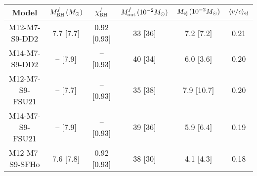 \begin{tabular}{c cc ccc}
	\toprule \toprule
	Model & $M_{\rm BH}^f\,(M_\odot)$ & $\chi_{\rm BH}^f$ & $M_{\rm out}^f\,(10^{-2} M_\odot)$ & $M_{\rm ej}\,(10^{-2} M_\odot)$ & $\langle v/c \rangle_{\rm ej}$\\
	\midrule
	M12-M7-S9-DD2 & 7.7 [7.7] & 0.92 [0.93] & 33 [36] & 7.2 [7.2] & 0.21\\
	M14-M7-S9-DD2 & -- [7.9] & -- [0.93] & 40 [34] & 6.0 [3.6] & 0.20\\
	M12-M7-S9-FSU21 & -- [7.7] & -- [0.93] & 35 [38] & 7.9 [10.7] & 0.20\\
	M14-M7-S9-FSU21 & -- [7.9] & -- [0.93] & 39 [36] & 5.9 [6.4] & 0.19\\
	M12-M7-S9-SFHo & 7.6 [7.8] & 0.92 [0.93] & 38 [30] &  4.1 [4.3] & 0.18\\
	\bottomrule \bottomrule
\end{tabular}